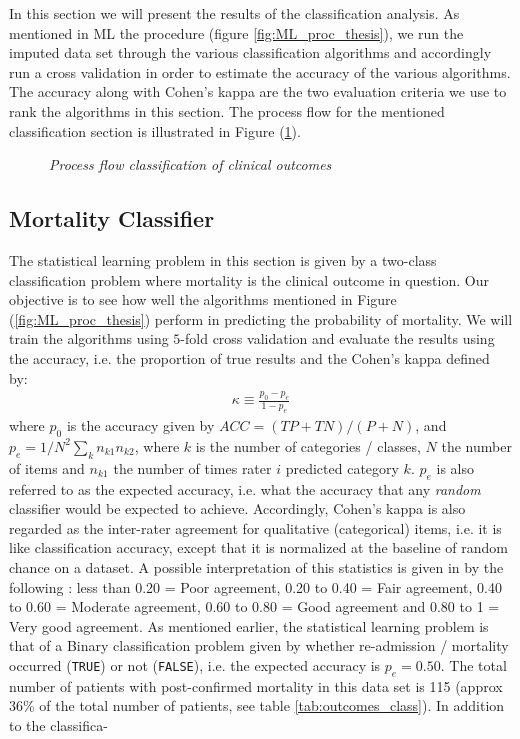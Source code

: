 \documentclass[../thesis.tex]{subfiles}
\begin{document}
\noindent In this section we will present the results of the classification analysis. As mentioned in ML the procedure (figure \ref{fig:ML_proc_thesis}), we run the imputed data set through the various classification algorithms and accordingly run a cross validation in order to estimate the accuracy of the various algorithms. The accuracy along with Cohen’s kappa are the two evaluation criteria we use to rank the algorithms in this section. The process flow for the mentioned classification section is illustrated in Figure (\ref{fig:process_flow_classification}). 

\begin{figure}
    \centering
    
    \caption[Process flow classification of clinical outcomes]{\textit{Process flow classification of clinical outcomes}}
    \label{fig:process_flow_classification}
\end{figure}

\subsection{Mortality Classifier}

\noindent The statistical learning problem in this section is given by a two-class classification problem where mortality is the clinical outcome in question. Our objective is to see how well the algorithms mentioned in Figure (\ref{fig:ML_proc_thesis}) perform in predicting the probability of mortality. We will train the algorithms using $5$-fold cross validation and evaluate the results using the accuracy, i.e. the proportion of true results and the Cohen's kappa defined by:
\begin{align}
    \kappa \equiv \frac{p_0 - p_e}{1 - p_e}
\end{align}
where $p_0$ is the accuracy given by ${\mathit  {ACC}}=({\mathit  {TP}}+{\mathit  {TN}})/(P+N)$, and $p_e = 1 / N^2 \sum_{k} n_{k1}n_{k2}$, where $k$ is the number of categories / classes, $N$ the number of items and $n_{k1}$ the number of times rater $i$ predicted category $k$. $p_e$ is also referred to as the expected accuracy, i.e. what the accuracy that any \textit{random} classifier would be expected to achieve. Accordingly, Cohen's kappa is also regarded as the inter-rater agreement for qualitative (categorical) items, i.e. it is like classification accuracy, except that it is normalized at the baseline of random chance on a dataset. A possible interpretation of this statistics is given in by the following \citep{ashby1991practical}: less than 0.20 = Poor agreement, 0.20 to 0.40 = Fair agreement, 0.40 to 0.60 = Moderate agreement, 0.60 to 0.80 = Good agreement and 0.80 to 1 = Very good agreement. As mentioned earlier, the statistical learning problem is that of a Binary classification problem given by whether  re-admission / mortality occurred (\texttt{TRUE}) or not (\texttt{FALSE}), i.e. the expected accuracy is $p_e = 0.50$. The total number of patients with post-confirmed mortality in this data set is 115 (approx 36\% of the total number of patients, see table \ref{tab:outcomes_class}). In addition to the classifica-
\end{document}
